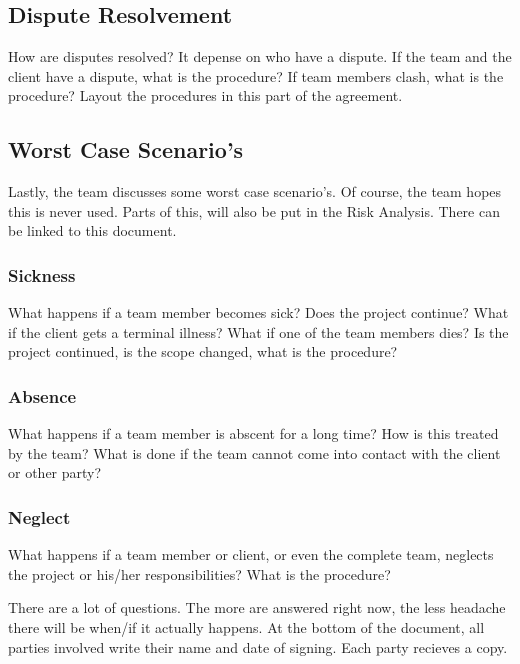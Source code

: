 \documentclass[10pt]{report}
\begin{document}
\subsection{Dispute Resolvement}

How are disputes resolved? It depense on who have a dispute. If the team and the client have a dispute, what is the procedure? If team members clash, what is the procedure? Layout the procedures in this part of the agreement.

\subsection{Worst Case Scenario's}

Lastly, the team discusses some worst case scenario's. Of course, the team hopes this is never used. Parts of this, will also be put in the Risk Analysis. There can be linked to this document.

\subsubsection{Sickness}

What happens if a team member becomes sick? Does the project continue? What if the client gets a terminal illness? What if one of the team members dies? Is the project continued, is the scope changed, what is the procedure?

\subsubsection{Absence}

What happens if a team member is abscent for a long time? How is this treated by the team? What is done if the team cannot come into contact with the client or other party?

\subsubsection{Neglect}

What happens if a team member or client, or even the complete team, neglects the project or his/her responsibilities? What is the procedure?

\bigskip

There are a lot of questions. The more are answered right now, the less headache there will be when/if it actually happens. At the bottom of the document, all parties involved write their name and date of signing. Each party recieves a copy.
\end{document}
